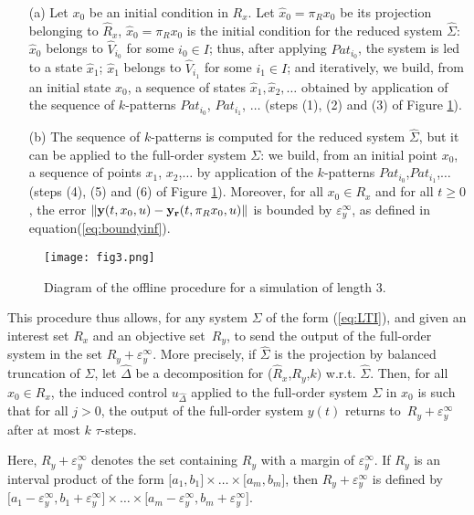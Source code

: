 \begin{itemize}
 \item[(a)] Let $x_0$ be an initial condition in $R_x$. Let $\hat x_0 = \pi_R x_0$ be its projection belonging
to $\hat R_x$, $\hat x_0 = \pi_R x_0$ is the initial condition for the reduced system $\hat \Sigma$:
$\hat x_0$ belongs to $\hat V_{i_0}$ for some $i_0 \in I$; thus, after applying $Pat_{i_0}$,
the system is led to a state $\hat x_1$; $\hat x_1$ belongs to $\hat V_{i_1}$ for some $i_1 \in I$; and
iteratively, we build, from an initial state $\hat x_0$, a sequence of states $\hat x_1, \hat x_2,\dots$
obtained by application of the sequence of $k$-patterns $Pat_{i_0}$, $Pat_{i_1}$, $\dots$ 
(steps (1), (2) and (3) of Figure \ref{fig:fig3}). 
\item[(b)]  The sequence of $k$-patterns is computed for the reduced system $\hat \Sigma$, but it can
 be applied to the full-order system $\Sigma$: we build, from an initial
 point $x_0$, a sequence of points $x_1$, $x_2$,$\dots$ by application of
 the $k$-patterns $Pat_{i_0}$,$Pat_{i_1}$,$\dots$ (steps (4), (5) and (6) of Figure \ref{fig:fig3}).
 Moreover, for all $x_0 \in R_x$ and for all $t \geq 0$, the error $\|{\bf y}(t,x_0,u)-{\bf y_r}(t,\pi_Rx_0,u)\|$ is bounded
 by $\varepsilon_y^\infty$, as defined in equation(\ref{eq:boundyinf}). 
\end{itemize}



\begin{figure}[ht]
\centering
 \texttt{[image: fig3.png]}
  \caption{Diagram of the offline procedure for a simulation of length 3.}
 \label{fig:fig3}
\end{figure}

 This procedure thus allows, for any system $\Sigma$ of the form (\ref{eq:LTI}), 
 and given an interest set $R_x$ and an objective set~$R_y$, to send the output 
 of the full-order system in the set $R_y + \varepsilon_y^\infty$. More precisely,
 if $\hat \Sigma$ is the projection by balanced truncation of $\Sigma$, let $\hat \Delta$
 be a decomposition for ($\hat R_x$,$R_y$,$k)$ w.r.t. $\hat \Sigma$.
 Then, for all $x_0\in R_x$, the induced control $u_{\hat{\Delta}}$ applied to the full-order
 system $\Sigma$ in $x_0$ is such that for all $j>0$, the 
 output of the full-order system $y(t)$ returns to~$R_y + \varepsilon_y^\infty$ after
 at most $k$ $\tau$-steps.


Here, $R_y + \varepsilon_y^\infty$ denotes the set containing $R_y$ with a margin of $\varepsilon_y^\infty$.
If $R_y$ is an interval product of the form $\lbrack a_1,b_1 \rbrack \times \dots
\times \lbrack a_m,b_m \rbrack$, then $R_y + \varepsilon_y^\infty$ is defined by 
$\lbrack a_1 - \varepsilon_y^\infty,b_1 + \varepsilon_y^\infty \rbrack \times \dots \times
\lbrack a_m - \varepsilon_y^\infty,b_m +\varepsilon_y^\infty \rbrack$.

